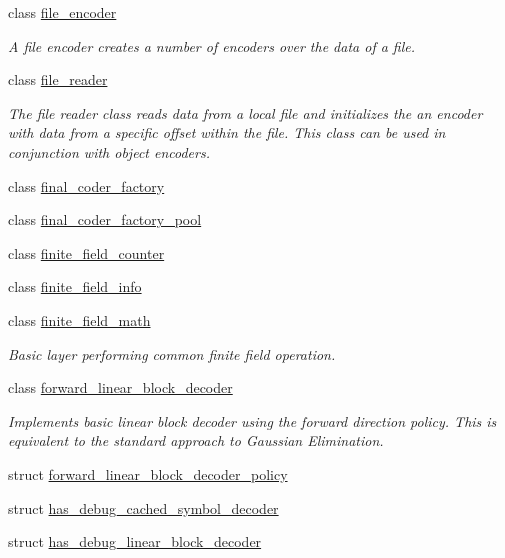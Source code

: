 \begin{DoxyCompactItemize}
class \hyperlink{classkodo_1_1file__encoder}{file\-\_\-encoder}
\begin{DoxyCompactList}\small\item\em A file encoder creates a number of encoders over the data of a file. \end{DoxyCompactList}\item 
class \hyperlink{classkodo_1_1file__reader}{file\-\_\-reader}
\begin{DoxyCompactList}\small\item\em The file reader class reads data from a local file and initializes the an encoder with data from a specific offset within the file. This class can be used in conjunction with object encoders. \end{DoxyCompactList}\item 
class \hyperlink{classkodo_1_1final__coder__factory}{final\-\_\-coder\-\_\-factory}
\item 
class \hyperlink{classkodo_1_1final__coder__factory__pool}{final\-\_\-coder\-\_\-factory\-\_\-pool}
\item 
class \hyperlink{classkodo_1_1finite__field__counter}{finite\-\_\-field\-\_\-counter}
\item 
class \hyperlink{classkodo_1_1finite__field__info}{finite\-\_\-field\-\_\-info}
\item 
class \hyperlink{classkodo_1_1finite__field__math}{finite\-\_\-field\-\_\-math}
\begin{DoxyCompactList}\small\item\em Basic layer performing common finite field operation. \end{DoxyCompactList}\item 
class \hyperlink{classkodo_1_1forward__linear__block__decoder}{forward\-\_\-linear\-\_\-block\-\_\-decoder}
\begin{DoxyCompactList}\small\item\em Implements basic linear block decoder using the forward direction policy. This is equivalent to the standard approach to Gaussian Elimination. \end{DoxyCompactList}\item 
struct \hyperlink{structkodo_1_1forward__linear__block__decoder__policy}{forward\-\_\-linear\-\_\-block\-\_\-decoder\-\_\-policy}
\item 
struct \hyperlink{structkodo_1_1has__debug__cached__symbol__decoder}{has\-\_\-debug\-\_\-cached\-\_\-symbol\-\_\-decoder}
\item 
struct \hyperlink{structkodo_1_1has__debug__linear__block__decoder}{has\-\_\-debug\-\_\-linear\-\_\-block\-\_\-decoder}

\end{DoxyCompactItemize}
